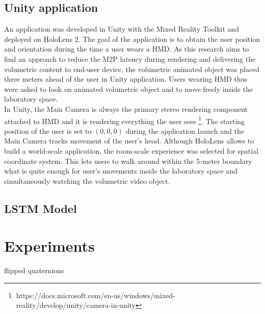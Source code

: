 \subsection{Unity application}
\label{sec:imp:programming:unity}
An application was developed in Unity with the Mixed Reality Toolkit and deployed on HoloLens 2. The goal of the application is to obtain the user position and orientation during the time a user wears a HMD. As this research aims to find an approach to reduce the M2P latency during rendering and delivering the volumetric content to end-user device, the volumetric animated object was placed three meters ahead of the user in Unity application. Users wearing HMD thus were asked to look on animated volumetric object and to move freely inside the laboratory space.\\
In Unity, the Main Camera is always the primary stereo rendering component attached to HMD and it is rendering everything the user sees \footnote{https://docs.microsoft.com/en-us/windows/mixed-reality/develop/unity/camera-in-unity}. The starting position of the user is set to $(0, 0, 0)$ during the application launch and the Main Camera tracks movement of the user's head. Although HoloLens allows to build a world-scale application, the room-scale experience was selected for spatial coordinate system. This lets users to walk around within the 5-meter boundary what is quite enough for user's movements inside the laboratory space and simultaneously watching the volumetric video object. 

\subsection{LSTM Model}
\label{sec:imp:programming:model}

\section{Experiments}
\label{sec:imp:experiments}
flipped quaternions

